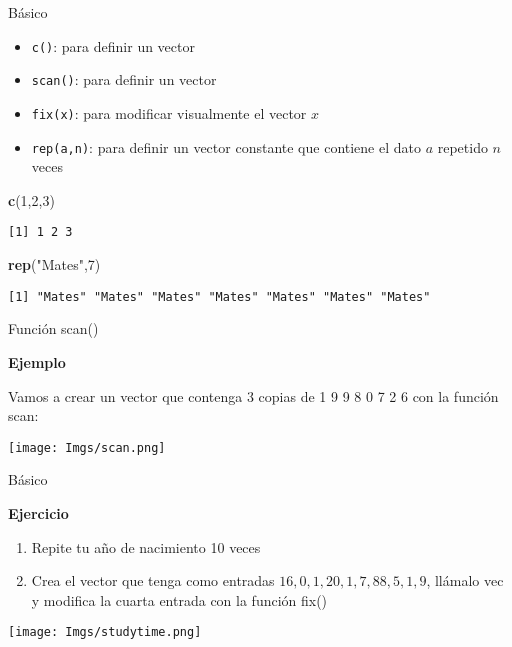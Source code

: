 \documentclass[
  ignorenonframetext,
]{beamer}
\newenvironment{Shaded}{\begin{snugshade}}{\end{snugshade}}
\newcommand{\DecValTok}[1]{\textcolor[rgb]{0.00,0.00,0.81}{#1}}
\newcommand{\KeywordTok}[1]{\textcolor[rgb]{0.13,0.29,0.53}{\textbf{#1}}}
\newcommand{\NormalTok}[1]{#1}
\newcommand{\StringTok}[1]{\textcolor[rgb]{0.31,0.60,0.02}{#1}}
\providecommand{\tightlist}{%
  \setlength{\itemsep}{0pt}\setlength{\parskip}{0pt}}
\begin{document}
\begin{frame}[fragile]{Básico}
\protect\hypertarget{buxe1sico}{}

\begin{itemize}
\tightlist
\item
  \texttt{c()}: para definir un vector
\item
  \texttt{scan()}: para definir un vector
\item
  \texttt{fix(x)}: para modificar visualmente el vector \(x\)
\item
  \texttt{rep(a,n)}: para definir un vector constante que contiene el
  dato \(a\) repetido \(n\) veces
\end{itemize}

\begin{Shaded}
\begin{Highlighting}[]
\KeywordTok{c}\NormalTok{(}\DecValTok{1}\NormalTok{,}\DecValTok{2}\NormalTok{,}\DecValTok{3}\NormalTok{)}
\end{Highlighting}
\end{Shaded}

\begin{verbatim}
[1] 1 2 3
\end{verbatim}

\begin{Shaded}
\begin{Highlighting}[]
\KeywordTok{rep}\NormalTok{(}\StringTok{"Mates"}\NormalTok{,}\DecValTok{7}\NormalTok{)}
\end{Highlighting}
\end{Shaded}

\begin{verbatim}
[1] "Mates" "Mates" "Mates" "Mates" "Mates" "Mates" "Mates"
\end{verbatim}

\end{frame}

\begin{frame}{Función scan()}
\protect\hypertarget{funciuxf3n-scan}{}

\textbf{Ejemplo}

Vamos a crear un vector que contenga 3 copias de 1 9 9 8 0 7 2 6 con la
función scan:

\texttt{[image: Imgs/scan.png]}

\end{frame}

\begin{frame}{Básico}
\protect\hypertarget{buxe1sico-1}{}

\textbf{Ejercicio}

\begin{enumerate}
\tightlist
\item
  Repite tu año de nacimiento 10 veces 
\item
  Crea el vector que tenga como entradas
  \(16, 0, 1, 20, 1, 7, 88, 5, 1, 9\), llámalo vec y modifica la cuarta
  entrada con la función fix() 
\end{enumerate}

\texttt{[image: Imgs/studytime.png]}

\end{frame}
\end{document}
